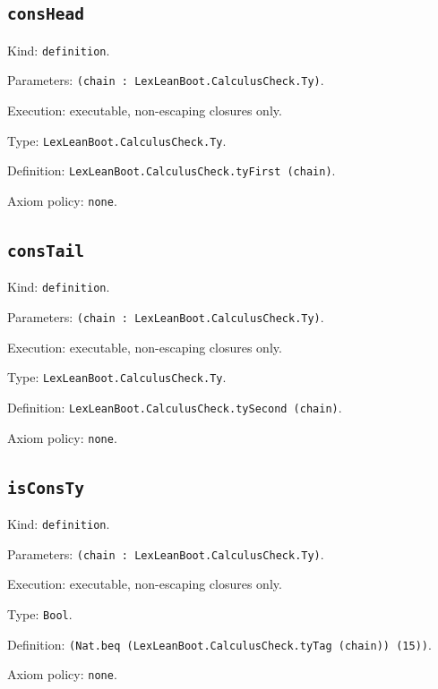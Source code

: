 \documentclass[11pt]{article}
\begin{document}
\subsection*{\texttt{consHead}}
\noindent Kind: \texttt{definition}.\par
\noindent Parameters: \texttt{(chain : LexLeanBoot.CalculusCheck.Ty)}.\par
\noindent Execution: executable, non-escaping closures only.\par
\noindent Type: \texttt{LexLeanBoot.CalculusCheck.Ty}.\par
\noindent Definition: \texttt{LexLeanBoot.CalculusCheck.tyFirst (chain)}.\par
\noindent Axiom policy: \texttt{none}.\par
\subsection*{\texttt{consTail}}
\noindent Kind: \texttt{definition}.\par
\noindent Parameters: \texttt{(chain : LexLeanBoot.CalculusCheck.Ty)}.\par
\noindent Execution: executable, non-escaping closures only.\par
\noindent Type: \texttt{LexLeanBoot.CalculusCheck.Ty}.\par
\noindent Definition: \texttt{LexLeanBoot.CalculusCheck.tySecond (chain)}.\par
\noindent Axiom policy: \texttt{none}.\par
\subsection*{\texttt{isConsTy}}
\noindent Kind: \texttt{definition}.\par
\noindent Parameters: \texttt{(chain : LexLeanBoot.CalculusCheck.Ty)}.\par
\noindent Execution: executable, non-escaping closures only.\par
\noindent Type: \texttt{Bool}.\par
\noindent Definition: \texttt{(Nat.beq (LexLeanBoot.CalculusCheck.tyTag (chain)) (15))}.\par
\noindent Axiom policy: \texttt{none}.\par
\end{document}
